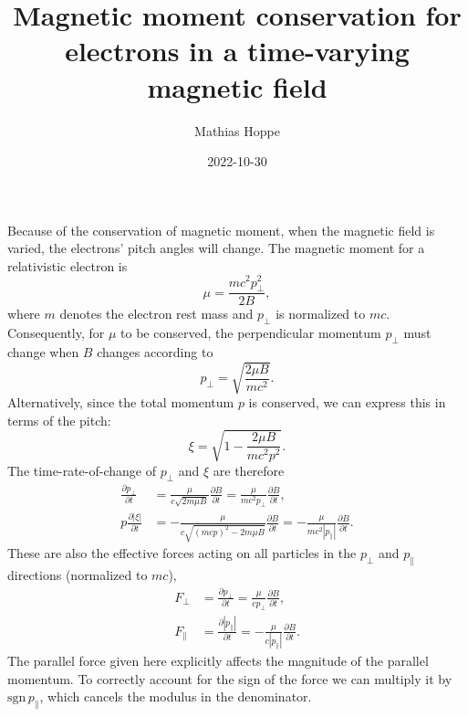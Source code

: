 \documentclass{notes}
\title{Magnetic moment conservation for electrons in a time-varying magnetic field}
\author{Mathias Hoppe}
\date{2022-10-30}
\newcommand{\ppar}{p_\parallel}
\newcommand{\pperp}{p_\perp}
\begin{document}
	\maketitle

	Because of the conservation of magnetic moment, when the magnetic field is
	varied, the electrons' pitch angles will change. The magnetic moment for a
	relativistic electron is
	\begin{equation}
		\mu = \frac{mc^2\pperp^2}{2B},
	\end{equation}
	where $m$ denotes the electron rest mass and $\pperp$ is normalized to $mc$.
	Consequently, for $\mu$ to be conserved, the perpendicular momentum $\pperp$
	must change when $B$ changes according to
	\begin{equation}
		\pperp = \sqrt{\frac{2\mu B}{mc^2}}.
	\end{equation}
	Alternatively, since the total momentum $p$ is conserved, we can express
	this in terms of the pitch:
	\begin{equation}
		\xi = \sqrt{1-\frac{2\mu B}{mc^2p^2}}.
	\end{equation}
	The time-rate-of-change of $\pperp$ and $\xi$ are therefore
	\begin{equation}
		\begin{aligned}
			\frac{\partial\pperp}{\partial t} &= \frac{\mu}{c\sqrt{2m\mu B}}
			\frac{\partial B}{\partial t} =
			\frac{\mu}{mc^2\pperp}\frac{\partial B}{\partial t},\\
			p\frac{\partial\left|\xi\right|}{\partial t} &= -\frac{\mu}{c\sqrt{(mcp)^2-2m\mu B}}
			\frac{\partial B}{\partial t} =
			-\frac{\mu}{mc^2\left|\ppar\right|}\frac{\partial B}{\partial t}.
		\end{aligned}
	\end{equation}
	These are also the effective forces acting on all particles in the $\pperp$
	and $\ppar$ directions (normalized to $mc$),
	\begin{equation}
		\begin{aligned}
			F_\perp &= \frac{\partial\pperp}{\partial t} =
			\frac{\mu}{c\pperp}\frac{\partial B}{\partial t},\\
			F_\parallel &= \frac{\partial\left|\ppar\right|}{\partial t} =
			-\frac{\mu}{c\left|\ppar\right|}\frac{\partial B}{\partial t}.
		\end{aligned}
	\end{equation}
	The parallel force given here explicitly affects the magnitude of the
	parallel momentum. To correctly account for the sign of the force we can
	multiply it by $\mathrm{sgn}\,\ppar$, which cancels the modulus in the
	denominator.
\end{document}
